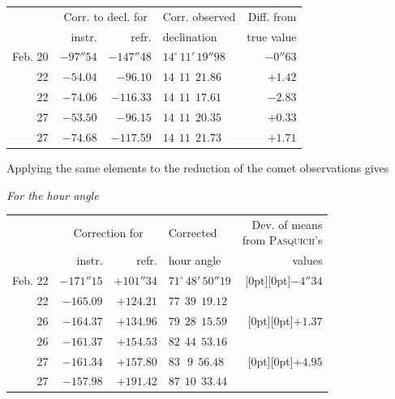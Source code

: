 \begin{center}\footnotesize\setlength{\tabcolsep}{4pt}
\begin{tabular}{r|r|r|l|r}
 & \multicolumn{2}{c|}{Corr. to decl. for} & Corr. observed & Diff. from\\
 & instr. & refr. & declination & true value \\
\hline
Feb. 20 & $-97''54$ & $-147''48$ & $14^\circ\,11'\,19''98$ & $-0''63$ \\
22 & $-54.04$ & $-96.10$ & $14\ \ 11\ \ 21.86$ & $+1.42$ \\
22 & $-74.06$ & $-116.33$ & $14\ \ 11\ \ 17.61$ & $-2.83$ \\
27 & $-53.50$ & $-96.15$ & $14\ \ 11\ \ 20.35$ & $+0.33$ \\
27 & $-74.68$ & $-117.59$ & $14\ \ 11\ \ 21.73$ & $+1.71$ \\
\end{tabular}
\end{center}

Applying the same elements to the reduction of the comet observations
gives

\begin{center}\footnotesize\setlength{\tabcolsep}{4pt}
\emph{For the hour angle}
\end{center}

\begin{center}\footnotesize\setlength{\tabcolsep}{4pt}
\begin{tabular}{r|r|r|l|r}
 & \multicolumn{2}{c|}{Correction for} & Corrected & \shortstack{Dev. of means\\from \textsc{Pasquich}'s}\\
 & instr. & refr. & hour angle & values \\
\hline
Feb. 22 & $-171''15$ & $+101''34$ & $71^\circ\,48'\,50''19$ & \raisebox{-5.5pt}[0pt][0pt]{$-4''34$} \\
22 & $-165.09$ & $+124.21$ & $77\ \ 39\ \ 19.12$ & \\
26 & $-164.37$ & $+134.96$ & $79\ \ 28\ \ 15.59$ & \raisebox{-5.5pt}[0pt][0pt]{$+1.37$} \\
26 & $-161.37$ & $+154.53$ & $82\ \ 44\ \ 53.16$ & \\
27 & $-161.34$ & $+157.80$ & $83\ \ \ 9\ \ 56.48$ & \raisebox{-5.5pt}[0pt][0pt]{$+4.95$} \\
27 & $-157.98$ & $+191.42$ & $87\ \ 10\ \ 33.44$ & \\
\end{tabular}
\end{center}


